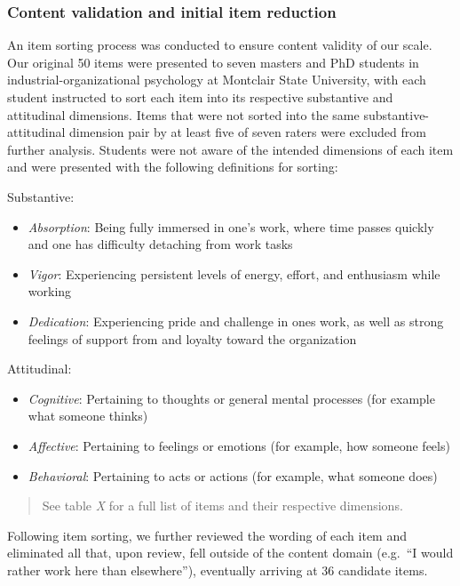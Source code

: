\documentclass[
  english,
  man]{apa6}
\begin{document}
\hypertarget{content-validation-and-initial-item-reduction}{%
\subsubsection{Content validation and initial item reduction}\label{content-validation-and-initial-item-reduction}}

An item sorting process was conducted to ensure content validity of our scale. Our original 50 items were presented to seven masters and PhD students in industrial-organizational psychology at Montclair State University, with each student instructed to sort each item into its respective substantive and attitudinal dimensions. Items that were not sorted into the same substantive-attitudinal dimension pair by at least five of seven raters were excluded from further analysis. Students were not aware of the intended dimensions of each item and were presented with the following definitions for sorting:

Substantive:

\begin{itemize}
\item
  \emph{Absorption}: Being fully immersed in one's work, where time passes quickly and one has difficulty detaching from work tasks
\item
  \emph{Vigor}: Experiencing persistent levels of energy, effort, and enthusiasm while working
\item
  \emph{Dedication}: Experiencing pride and challenge in ones work, as well as strong feelings of support from and loyalty toward the organization
\end{itemize}

Attitudinal:

\begin{itemize}
\item
  \emph{Cognitive}: Pertaining to thoughts or general mental processes (for example what someone thinks)
\item
  \emph{Affective}: Pertaining to feelings or emotions (for example, how someone feels)
\item
  \emph{Behavioral}: Pertaining to acts or actions (for example, what someone does)
\end{itemize}

\begin{quote}
See table \emph{X} for a full list of items and their respective dimensions.
\end{quote}

Following item sorting, we further reviewed the wording of each item and eliminated all that, upon review, fell outside of the content domain (e.g.~``I would rather work here than elsewhere''), eventually arriving at 36 candidate items.
\end{document}
